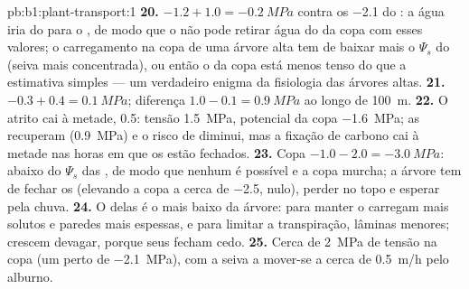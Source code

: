 \begin{solution}{pb:b1:plant-transport:1}
\textbf{20.} $-1.2 + 1.0 = \qty{-0.2}{MPa}$ contra os \qty{-2.1}{} do
: a água iria do  para o , de modo que o  não
pode retirar água do  da copa com esses valores; o carregamento
na copa de uma árvore alta tem de baixar mais o $\Psi_s$ do 
(seiva mais concentrada), ou então o  da copa está menos tenso
do que a estimativa simples --- um verdadeiro enigma da fisiologia das
árvores altas.
\textbf{21.} $-0.3 + 0.4 = \qty{0.1}{MPa}$; diferença $1.0 - 0.1 =
\qty{0.9}{MPa}$ ao longo de \qty{100}{m}.
\textbf{22.} O atrito cai à metade, \qty{0.5}{}: tensão \qty{1.5}{MPa},
potencial da copa \qty{-1.6}{MPa}; as  recuperam 
(\qty{0.9}{MPa}) e o risco de  diminui, mas a fixação de
carbono cai à metade nas horas em que os  estão fechados.
\textbf{23.} Copa $-1.0 - 2.0 = \qty{-3.0}{MPa}$: abaixo do $\Psi_s$
das , de modo que nenhum  é possível e a copa
murcha; a árvore tem de fechar os  (elevando a copa a cerca
de \qty{-2.5}{},  nulo), perder  no topo e esperar
pela chuva.
\textbf{24.} O  delas é o mais baixo da árvore: para
manter o  carregam mais solutos e paredes mais espessas, e
para limitar a transpiração, lâminas menores; crescem devagar, porque
seus  fecham cedo.
\textbf{25.} Cerca de \qty{2}{MPa} de tensão na copa (um  perto de \qty{-2.1}{MPa}), com a seiva a mover-se a cerca de
\qty{0.5}{m/h} pelo alburno.
\end{solution}
